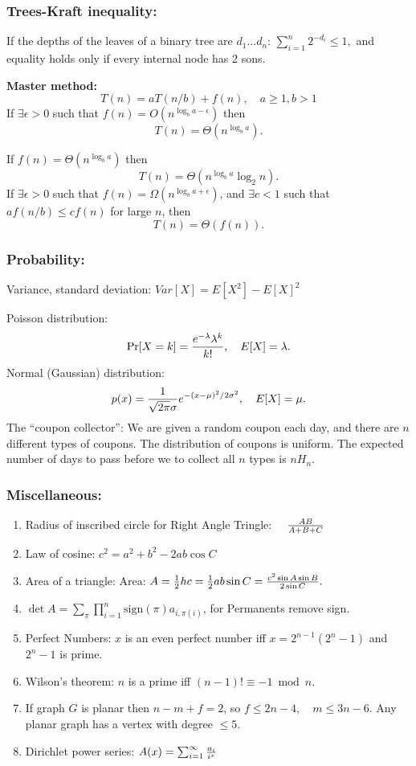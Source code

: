 \documentclass[12pt]{extarticle}
\begin{document}
\begin{multicols*}{2}
			\subsubsection*{Trees-Kraft inequality:}
			If the depths of the leaves of a binary tree are $d_1 \ldots d_n$:
			$
			\sum_{i=1}^n 2^{- d_i} \leq 1,
			$
			and equality holds only if every internal node has 2 sons.

			\par\vskip 3pt
			\textbf{Master method:}
			$$T(n) = aT(n/b) + f(n), \quad a\geq 1, b > 1$$
			If $\exists \epsilon > 0$ such that $f(n) = O(n^{\log_b a - \epsilon})$ then
			$$T(n) = \Theta(n^{\log_b a}).$$
			\par
			If $f(n) = \Theta(n^{\log_b a})$ then
			$$T(n) = \Theta(n^{\log_b a} \log_2 n).$$
			If $\exists \epsilon > 0$ such that $f(n) = \Omega(n^{\log_b a + \epsilon})$,
			and $\exists c < 1$ such that $a f(n/b) \leq cf(n)$ for large $n$,
			then
			$$T(n) = \Theta(f(n)).$$
			\subsubsection*{Probability:}
			Variance, standard deviation:
			$Var[X] = E[X^2] - E[X]^2$
			\par\vskip 5pt
			Poisson distribution:
			$$
			\Pr[X = k] = {e^{-\lambda} \lambda^k \over k!}, \quad  E[X] = \lambda.
			$$
			Normal (Gaussian) distribution:
			$$
			p(x) = {1 \over \sqrt{2 \pi} \sigma} e^{-(x-\mu)^2/2\sigma^2}, \quad E[X] = \mu.
			$$
			The ``coupon collector'':
			We are given a random coupon each day,
			and there are $n$ different types of coupons.
			The distribution of coupons is uniform.
			The expected number of days to pass before we to collect all $n$ types is $n H_n.$
			\subsubsection*{Miscellaneous:}
			
			\begin{enumerate}
				\item 			Radius of inscribed circle for Right Angle Tringle:
				$\quad {A B \over A + B + C}$
				\item Law of cosine: 			$c^2 = a^2 + b^2 - 2ab \cos C$
				\item Area of a triangle: Area:
				$A = \frac{1}{2} h c
					= \frac{1}{2} a b \sin C
					= {c^2 \sin A \sin B \over 2 \sin C}.$
				\item 			$\det A = \sum_\pi \prod_{i=1}^n \text{sign}(\pi) a_{i,\pi(i)}$, 
				for Permanents remove sign.
				\item Perfect Numbers: $x$ is an even perfect number iff $x = 2^{n-1}(2^n - 1)$ and $2^n - 1$ is prime.
				\item Wilson's theorem: $n$ is a prime iff
				$(n-1)! \equiv -1 \bmod n.$
				\item If graph $G$ is planar then $n - m + f = 2$, so
				$f \leq 2n - 4, \quad m \leq 3 n - 6.$
				Any planar graph has a vertex with degree $\leq 5$.
				\item Dirichlet power series:
				$A(x) =\sum_{i=1}^\infty{a_i \over i^x}$
				

\end{enumerate}
\end{multicols*}
\end{document}
